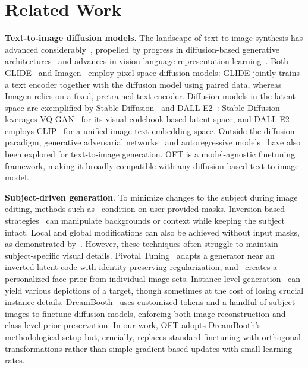 \section{Related Work}

\textbf{Text-to-image diffusion models}. The landscape of text-to-image synthesis has advanced considerably~\cite{saharia2022photorealistic,ramesh2022hierarchical,rombach2022high,gu2022vector,nichol2022glide}, propelled by progress in diffusion-based generative architectures~\cite{ho2020denoising,song2021score,song2021denoising,dhariwal2021diffusion} and advances in vision-language representation learning~\cite{su2020vlbert,lu2019vilbert,radford2021learning,wang2021simvlm,li2022blip,li2023blip,alayrac2022flamingo,schuhmann2022laion}. Both GLIDE~\cite{nichol2022glide} and Imagen~\cite{saharia2022photorealistic} employ pixel-space diffusion models: GLIDE jointly trains a text encoder together with the diffusion model using paired data, whereas Imagen relies on a fixed, pretrained text encoder. Diffusion models in the latent space are exemplified by Stable Diffusion~\cite{rombach2022high} and DALL-E2~\cite{ramesh2022hierarchical}: Stable Diffusion leverages VQ-GAN~\cite{esser2021taming} for its visual codebook-based latent space, and DALL-E2 employs CLIP~\cite{radford2021learning} for a unified image-text embedding space. Outside the diffusion paradigm, generative adversarial networks~\cite{reed2016generative,zhang2017stackgan,xu2018attngan,li2019controllable} and autoregressive models~\cite{ramesh2021zero,ding2021cogview,wu2022nuwa,yuscaling} have also been explored for text-to-image generation. OFT is a model-agnostic finetuning framework, making it broadly compatible with any diffusion-based text-to-image model.

\textbf{Subject-driven generation}. To minimize changes to the subject during image editing, methods such as~\cite{avrahami2022blended,nichol2022glide} condition on user-provided masks. Inversion-based strategies~\cite{choi2021ilvr,dhariwal2021diffusion,ramesh2022hierarchical,gal2022image} can manipulate backgrounds or context while keeping the subject intact. Local and global modifications can also be achieved without input masks, as demonstrated by~\cite{hertz2022prompt}. However, these techniques often struggle to maintain subject-specific visual details. Pivotal Tuning~\cite{roich2022pivotal} adapts a generator near an inverted latent code with identity-preserving regularization, and~\cite{nitzan2022mystyle} creates a personalized face prior from individual image sets. Instance-level generation~\cite{casanova2021instance} can yield various depictions of a target, though sometimes at the cost of losing crucial instance details. DreamBooth~\cite{ruiz2023dreambooth} uses customized tokens and a handful of subject images to finetune diffusion models, enforcing both image reconstruction and class-level prior preservation. In our work, OFT adopts DreamBooth’s methodological setup but, crucially, replaces standard finetuning with orthogonal transformations rather than simple gradient-based updates with small learning rates.

